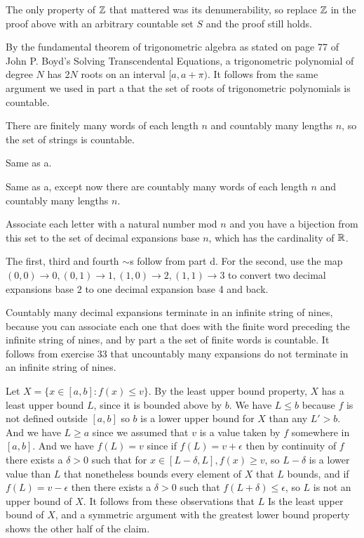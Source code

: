 \documentclass[11pt, oneside]{article}   	%
\begin{document}
\item The only property of $\mathbb{Z}$ that mattered was its denumerability, so replace $\mathbb{Z}$ in the proof above with an arbitrary countable set $S$ and the proof still holds. 
\item By the fundamental theorem of trigonometric algebra as stated on page 77 of John P. Boyd's Solving Transcendental Equations, a trigonometric polynomial of degree $N$ has $2N$ roots on an interval $[a, a + \pi)$. It follows from the same argument we used in part a that the set of roots of trigonometric polynomials is countable.
\ee
\item \be
\item There are finitely many words of each length $n$ and countably many lengths $n$, so the set of strings is countable.
\item Same as a.
\item Same as a, except now there are countably many words of each length $n$ and countably many lengths $n$.
\item Associate each letter with a natural number mod $n$ and you have a bijection from this set to the set of decimal expansions base $n$, which has the cardinality of $\mathbb{R}$.
\item The first, third and fourth $\sim$s follow from part d. For the second, use the map $(0, 0) \to 0, (0, 1) \to 1, (1, 0) \to 2, (1, 1) \to 3$ to convert two decimal expansions base $2$ to one decimal expansion base 4 and back.
\item Countably many decimal expansions terminate in an infinite string of nines, because you can associate each one that does with the finite word preceding the infinite string of nines, and by part a the set of finite words is countable. It follows from exercise 33 that uncountably many expansions do not terminate in an infinite string of nines.
\ee
\item Let $X = \{x \in [a, b]: f(x) \le v\}$. By the least upper bound property, $X$ has a least upper bound $L$, since it is bounded above by $b$. We have $L \le b$ because $f$ is not defined outside $[a, b]$ so $b$ is a lower upper bound for $X$ than any $L' > b$. And we have $L \ge a$ since we assumed that $v$ is a value taken by $f$ somewhere in $[a, b]$. And we have $f(L) = v$ since if $f(L) = v + \epsilon$ then by continuity of $f$ there exists a $\delta > 0$ such that for $x \in [L - \delta, L], f(x) \ge v$, so $L- \delta$ is a lower value than $L$ that nonetheless bounds every element of $X$ that $L$ bounds, and if $f(L) = v -\epsilon$ then there exists a $\delta > 0$ such that $f(L + \delta) \le \epsilon$, so $L$ is not an upper bound of $X$. It follows from these observations that $L$ Is the least upper bound of $X$, and a symmetric argument with the greatest lower bound property shows the other half of the claim.
\end{document}
